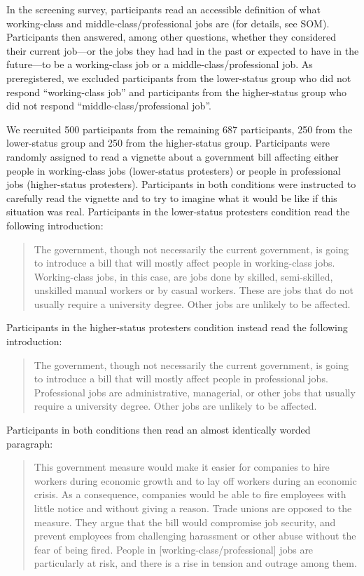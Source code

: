 \documentclass[12pt, letterpaper]{article}
\begin{document}
In the screening survey, participants read an accessible definition of
what working-class and middle-class/professional jobs are (for details,
see SOM). Participants then answered, among other questions, whether
they considered their current job---or the jobs they had had in the past
or expected to have in the future---to be a working-class job or a
middle-class/professional job. As preregistered, we excluded
participants from the lower-status group who did not respond
``working-class job'' and participants from the higher-status group who
did not respond ``middle-class/professional job''.

We recruited 500 participants from the remaining 687 participants, 250
from the lower-status group and 250 from the higher-status group.
Participants were randomly assigned to read a vignette about a
government bill affecting either people in working-class jobs
(lower-status protesters) or people in professional jobs (higher-status
protesters). Participants in both conditions were instructed to
carefully read the vignette and to try to imagine what it would be like
if this situation was real. Participants in the lower-status protesters
condition read the following introduction:

\begin{quote}
The government, though not necessarily the current government, is going
to introduce a bill that will mostly affect people in working-class
jobs. Working-class jobs, in this case, are jobs done by skilled,
semi-skilled, unskilled manual workers or by casual workers. These are
jobs that do not usually require a university degree. Other jobs are
unlikely to be affected.
\end{quote}

\noindent Participants in the higher-status protesters condition instead
read the following introduction:

\begin{quote}
The government, though not necessarily the current government, is going
to introduce a bill that will mostly affect people in professional jobs.
Professional jobs are administrative, managerial, or other jobs that
usually require a university degree. Other jobs are unlikely to be
affected.
\end{quote}

\noindent Participants in both conditions then read an almost
identically worded paragraph:

\begin{quote}
This government measure would make it easier for companies to hire
workers during economic growth and to lay off workers during an economic
crisis. As a consequence, companies would be able to fire employees with
little notice and without giving a reason. Trade unions are opposed to
the measure. They argue that the bill would compromise job security, and
prevent employees from challenging harassment or other abuse without the
fear of being fired. People in {[}working-class/professional{]} jobs are
particularly at risk, and there is a rise in tension and outrage among
them.
\end{quote}
\end{document}
